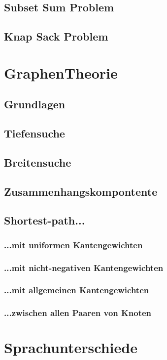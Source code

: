 \documentclass[a4paper]{article}
\begin{document}
\subsection{Subset Sum Problem}

\subsection{Knap Sack Problem}


\section{GraphenTheorie}

\subsection{Grundlagen}

\subsection{Tiefensuche}

\subsection{Breitensuche}

\subsection{Zusammenhangskompontente}

\subsection{Shortest-path...}

\subsubsection{...mit uniformen Kantengewichten}

\subsubsection{...mit nicht-negativen Kantengewichten}

\subsubsection{...mit allgemeinen Kantengewichten}

\subsubsection{...zwischen allen Paaren von Knoten}



\section{Sprachunterschiede}
\end{document}
